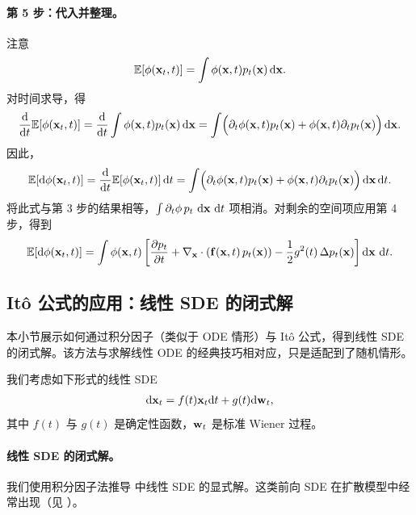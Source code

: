 \paragraph{第 5 步：代入并整理。}
注意
\[
\mathbb{E}[\phi({\mathbf{x}}_t,t)] = \int \phi({\mathbf{x}},t) p_t({\mathbf{x}}) \mathop{}\!\mathrm{d}{\mathbf{x}}.
\]
对时间求导，得
\[
\frac{\mathop{}\!\mathrm{d}}{\mathop{}\!\mathrm{d} t}\mathbb{E}[\phi({\mathbf{x}}_t,t)]
= \frac{\mathop{}\!\mathrm{d}}{\mathop{}\!\mathrm{d} t}\int \phi({\mathbf{x}},t) p_t({\mathbf{x}}) \mathop{}\!\mathrm{d}{\mathbf{x}}
= \int\Bigl(\partial_t\phi({\mathbf{x}},t) p_t({\mathbf{x}}) + \phi({\mathbf{x}},t) \partial_t p_t({\mathbf{x}})\Bigr)\mathop{}\!\mathrm{d}{\mathbf{x}}.
\]
因此，
\[
\mathbb{E}[\mathop{}\!\mathrm{d} \phi({\mathbf{x}}_t,t)]
= \frac{\mathop{}\!\mathrm{d}}{\mathop{}\!\mathrm{d} t}\mathbb{E}[\phi({\mathbf{x}}_t,t)] \mathop{}\!\mathrm{d} t
= \int\Bigl(\partial_t\phi({\mathbf{x}},t) p_t({\mathbf{x}}) + \phi({\mathbf{x}},t) \partial_t p_t({\mathbf{x}})\Bigr)\mathop{}\!\mathrm{d}{\mathbf{x}} \mathop{}\!\mathrm{d} t.
\]
将此式与第 3 步的结果相等，$\int \partial_t\phi\,p_t\,\mathop{}\!\mathrm{d} {\mathbf{x}}\,\mathop{}\!\mathrm{d} t$ 项相消。对剩余的空间项应用第 4 步，得到
\[
\mathbb{E}[\mathop{}\!\mathrm{d} \phi({\mathbf{x}}_t, t)]
= \int \phi({\mathbf{x}}, t)\left[ \frac{\partial p_t}{\partial t}
+ \nabla_{{\mathbf{x}}}\cdot({\mathbf{f}}({\mathbf{x}},t)\,p_t({\mathbf{x}}))
- \frac{1}{2} g^2(t)\,\Delta p_t({\mathbf{x}}) \right]\mathop{}\!\mathrm{d} {\mathbf{x}}\,\mathop{}\!\mathrm{d} t.
\]

\subsection{It\^o 公式的应用：线性 SDE 的闭式解}\label{subsec:rigorous-proof-linear-sde}
本小节展示如何通过积分因子（类似于 ODE 情形）与 It\^o 公式，得到线性 SDE 的闭式解。该方法与求解线性 ODE 的经典技巧相对应，只是适配到了随机情形。

我们考虑如下形式的线性 SDE
\begin{align}\label{eq:app-linear-sde}
    \mathrm{d}{\mathbf{x}}_t = f(t){\mathbf{x}}_t \mathrm{d}t + g(t) \mathrm{d}{\mathbf{w}}_t,
\end{align}
其中 $f(t)$ 与 $g(t)$ 是确定性函数，${\mathbf{w}}_t$ 是标准 Wiener 过程。
\paragraph{线性 SDE 的闭式解。} 我们使用积分因子法推导  中线性 SDE 的显式解。这类前向 SDE 在扩散模型中经常出现（见 ）。


